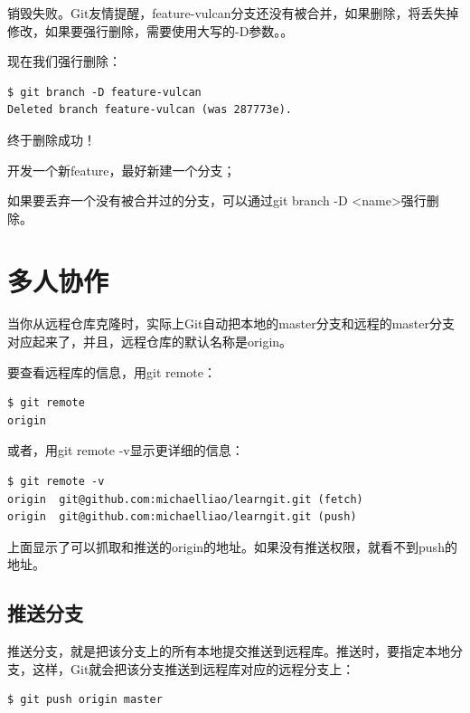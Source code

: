 销毁失败。Git友情提醒，feature-vulcan分支还没有被合并，如果删除，将丢失掉修改，如果要强行删除，需要使用大写的-D参数。。

现在我们强行删除：

\begin{verbatim}
$ git branch -D feature-vulcan
Deleted branch feature-vulcan (was 287773e).
\end{verbatim}

终于删除成功！

\begin{tcolorbox}

开发一个新feature，最好新建一个分支；

如果要丢弃一个没有被合并过的分支，可以通过git branch -D <name>强行删除。
\end{tcolorbox}

\section{多人协作}
当你从远程仓库克隆时，实际上Git自动把本地的master分支和远程的master分支对应起来了，并且，远程仓库的默认名称是origin。

要查看远程库的信息，用git remote：

\begin{verbatim}
$ git remote
origin
\end{verbatim}

或者，用git remote -v显示更详细的信息：

\begin{verbatim}
$ git remote -v
origin  git@github.com:michaelliao/learngit.git (fetch)
origin  git@github.com:michaelliao/learngit.git (push)
\end{verbatim}

上面显示了可以抓取和推送的origin的地址。如果没有推送权限，就看不到push的地址。

\subsection{推送分支}

推送分支，就是把该分支上的所有本地提交推送到远程库。推送时，要指定本地分支，这样，Git就会把该分支推送到远程库对应的远程分支上：

\begin{verbatim}
$ git push origin master
\end{verbatim}

